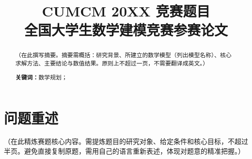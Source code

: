 \documentclass[12pt, a4paper]{article}
\title{
    \vspace{-1cm}
    {\Large \textbf{CUMCM 20XX 竞赛题目}} \\[0.5em]
    {\large 全国大学生数学建模竞赛参赛论文}
}
\author{}
\date{}
\begin{document}

\setcounter{page}{1}

\maketitle
\thispagestyle{plain}

\begin{abstract}
\noindent
（在此撰写摘要。摘要需概括：研究背景、所建立的数学模型（列出模型名称）、核心求解方法、主要结论与数值结果。原则上不超过一页，不需要翻译成英文。）

\vspace{1em}
\noindent\textbf{关键词：}数学规划；%
\end{abstract}

\newpage

\section{问题重述}

（在此精炼赛题核心内容。需提炼题目的研究对象、给定条件和核心目标，不超过半页。避免直接复制原题，需用自己的语言重新表述，体现对题意的精准把握。）

\end{document}
